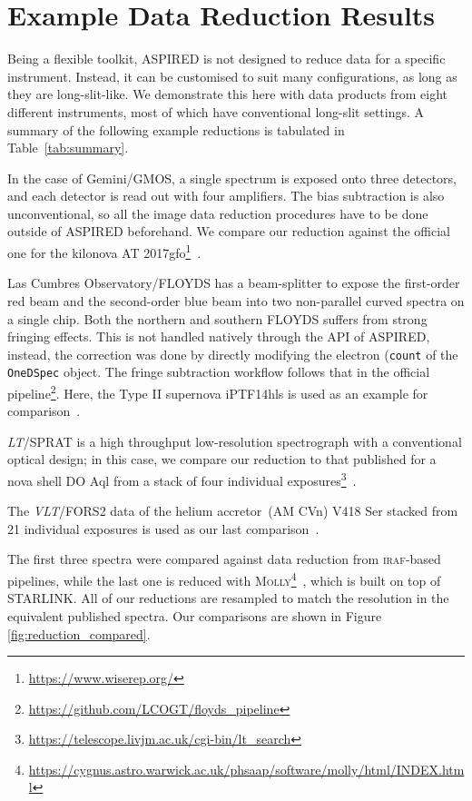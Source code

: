 \documentclass[linenumbers, twocolumn]{aastex631}
\begin{document}
\section{Example Data Reduction Results}
\label{sec:examples}
Being a flexible toolkit, \textsc{ASPIRED} is not designed to reduce data for a
specific instrument. Instead, it can be customised to suit many configurations,
as long as they are long-slit-like. We demonstrate this here with data products
from eight different instruments, most of which have conventional long-slit
settings. A summary of the following example reductions is tabulated in
Table~\ref{tab:summary}.

In the case of Gemini/GMOS, a single spectrum is exposed onto
three detectors, and each detector is read out with four amplifiers. The bias 
subtraction is also unconventional, so all the image data reduction procedures
have to be done outside of \textsc{ASPIRED} beforehand. We compare our reduction against
the official one for the kilonova AT 2017gfo\footnote{\url{https://www.wiserep.org/}}~\citep{2017ApJ...848L..32M}. 

Las Cumbres Observatory/FLOYDS has a beam-splitter to expose the first-order
red beam and the second-order blue beam into two non-parallel
curved spectra on a single chip. Both the northern and southern FLOYDS suffers
from strong fringing effects. This is not handled natively through the API of 
\textsc{ASPIRED}, instead, the correction was done by directly modifying the
electron (\texttt{count} of the \texttt{OneDSpec} object. The fringe subtraction
workflow follows that in the official
pipeline\footnote{\url{https://github.com/LCOGT/floyds_pipeline}}. Here, the
Type II supernova iPTF14hls is used as an example for
comparison~\citep{2017Natur.551..210A}.

\textit{LT}/SPRAT is a high throughput low-resolution spectrograph with
a conventional optical design; in this case, we compare our reduction to that published for a nova 
shell DO Aql from a stack of four individual 
exposures\footnote{\url{https://telescope.livjm.ac.uk/cgi-bin/lt_search}}~\citep{2020MNRAS.499.2959H}. 

The \textit{VLT}/FORS2 data
of the helium accretor~(AM CVn) V418 Ser stacked from 21 individual exposures is
used as our last comparison~\citep{2020MNRAS.496.1243G}. 

The first three spectra were 
compared against data reduction from \textsc{iraf}-based pipelines, while the
last one is reduced with \textsc{Molly}\footnote{
\url{https://cygnus.astro.warwick.ac.uk/phsaap/software/molly/html/INDEX.html}}~\citep{2019ascl.soft07012M},
which is built on top of \textsc{STARLINK}. All of our reductions are resampled to match
the resolution in the equivalent published spectra. Our comparisons are shown in Figure \ref{fig:reduction_compared}.
\end{document}
